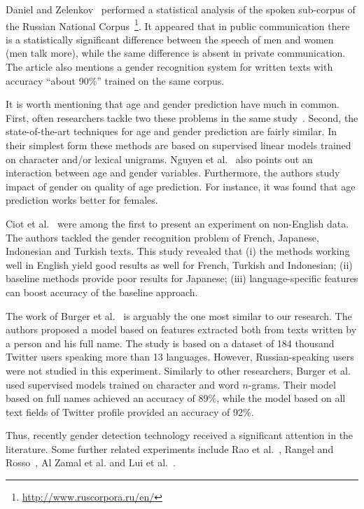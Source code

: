 \documentclass[runningheads,a4paper]{llncs}
\begin{document}
Daniel and Zelenkov~\cite{daniel2013research} performed a statistical analysis of the spoken sub-corpus of the Russian National Corpus~\footnote{\url{http://www.ruscorpora.ru/en/}}. It appeared that in public communication there is a statistically significant difference between the speech of men and women (men talk more), while the same difference is absent in private communication. The article also mentions a gender recognition system for written texts with accuracy ``about 90\%'' trained on the same corpus. 

It is worth mentioning that age and gender prediction have much in common. First, often researchers tackle two these problems in the same study~\cite{rangel2013use,peersman2011predicting,goswami2009stylometric}. Second, the state-of-the-art techniques for age and gender prediction are fairly similar. In their simplest form these methods are based on supervised linear models trained on character and/or lexical unigrams. Nguyen et al.~\cite{nguyen2013old} also points out an interaction between age and gender variables. Furthermore, the authors study impact of gender on quality of age prediction. For instance, it was found that age prediction works better for females.   

Ciot et al.~\cite{ciot2013gender} were among the first to present an experiment on non-English data. The authors tackled the gender recognition problem of French, Japanese, Indonesian and Turkish texts.  This study revealed that (i) the methods working well in English yield good results as well for French, Turkish and Indonesian; (ii) baseline methods provide poor results for Japanese; (iii) language-specific features can boost accuracy of the baseline approach. 

The work of Burger et al.~\cite{burger2011discriminating}  is arguably the one most similar to our research. The authors proposed a model based on features extracted both from texts written by a person and his full name. The study is based on a dataset of 184 thousand Twitter users speaking more than 13 languages. However, Russian-speaking users were not studied in this experiment. Similarly to other researchers, Burger et al. used supervised models trained on character and word $n$-grams. Their model based on full names achieved an accuracy of 89\%, while the model based on all text fields of Twitter profile provided an accuracy of 92\%.  

Thus, recently gender detection technology received a significant attention in the literature. Some further related experiments include Rao et al.~\cite{rao2010classifying}, Rangel and Rosso~\cite{rangel2013use}, Al Zamal et al.\cite{al2012homophily} and Lui et al.~\cite{liu2012using}.
  
\end{document}
